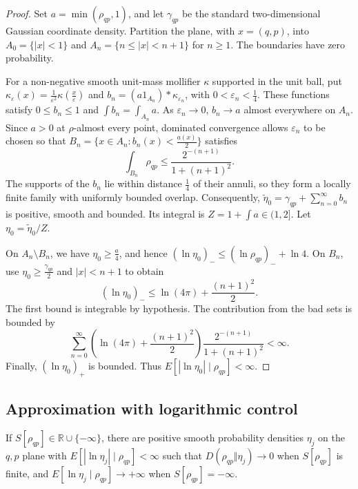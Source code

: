 \documentclass{techbrief}
\begin{document}
\begin{proof}
	Set $a=\min(\rho_{qp},1)$, and let $\gamma_{qp}$ be the standard two-dimensional Gaussian coordinate density. Partition the plane, with $x=(q,p)$, into $A_0=\{|x|<1\}$ and $A_n=\{n\leq|x|<n+1\}$ for $n\geq1$. The boundaries have zero probability.

	For a non-negative smooth unit-mass mollifier $\kappa$ supported in the unit ball, put $\kappa_\varepsilon(x)=\frac{1}{\varepsilon^2}\kappa(\frac{x}{\varepsilon})$ and $b_n=(a1_{A_n})*\kappa_{\varepsilon_n}$, with $0<\varepsilon_n<\frac{1}{4}$. These functions satisfy $0\leq b_n\leq1$ and $\int b_n=\int_{A_n}a$. As $\varepsilon_n\to0$, $b_n\to a$ almost everywhere on $A_n$. Since $a>0$ at $\rho$-almost every point, dominated convergence allows $\varepsilon_n$ to be chosen so that $B_n=\{x\in A_n:b_n(x)<\frac{a(x)}{2}\}$ satisfies
	\begin{equation*}
		\int_{B_n}\rho_{qp}\leq\frac{2^{-(n+1)}}{1+(n+1)^2}.
	\end{equation*}
	The supports of the $b_n$ lie within distance $\frac{1}{4}$ of their annuli, so they form a locally finite family with uniformly bounded overlap. Consequently, $\widetilde\eta_0=\gamma_{qp}+\sum_{n=0}^{\infty}b_n$ is positive, smooth and bounded. Its integral is $Z=1+\int a\in(1,2]$. Let $\eta_0=\widetilde\eta_0/Z$.

	On $A_n\setminus B_n$, we have $\eta_0\geq\frac{a}{4}$, and hence $(\ln\eta_0)_-\leq(\ln\rho_{qp})_-+\ln4$. On $B_n$, use $\eta_0\geq\frac{\gamma_{qp}}{2}$ and $|x|<n+1$ to obtain
	\begin{equation*}
		(\ln\eta_0)_-\leq\ln(4\pi)+\frac{(n+1)^2}{2}.
	\end{equation*}
	The first bound is integrable by hypothesis. The contribution from the bad sets is bounded by
	\begin{equation*}
		\sum_{n=0}^{\infty}
		\left(\ln(4\pi)+\frac{(n+1)^2}{2}\right)
		\frac{2^{-(n+1)}}{1+(n+1)^2}<\infty.
	\end{equation*}
	Finally, $(\ln\eta_0)_+$ is bounded. Thus $E[|\ln\eta_0|\mid\rho_{qp}]<\infty$.
\end{proof}

\subsection{Approximation with logarithmic control}

\begin{lemma}\label{smoothLogApproximation}
	If $S[\rho_{qp}]\in\mathbb{R}\cup\{-\infty\}$, there are positive smooth probability densities $\eta_j$ on the $q,p$ plane with $E[|\ln\eta_j|\mid\rho_{qp}]<\infty$ such that $D(\rho_{qp}\Vert\eta_j)\to0$ when $S[\rho_{qp}]$ is finite, and $E[\ln\eta_j\mid\rho_{qp}]\to+\infty$ when $S[\rho_{qp}]=-\infty$.
\end{lemma}
\end{document}
